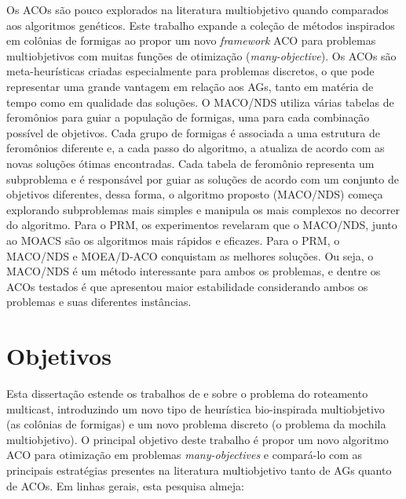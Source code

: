 Os \acp{ACO} são pouco explorados na literatura multiobjetivo quando comparados aos algoritmos genéticos. Este trabalho expande a coleção de métodos inspirados em colônias de formigas ao propor um novo \textit{framework} ACO para problemas multiobjetivos com muitas funções de otimização (\textit{many-objective}). Os ACOs são meta-heurísticas criadas especialmente para problemas discretos, o que pode representar uma grande vantagem em relação aos AGs, tanto em matéria de tempo como em qualidade das soluções. O MACO/NDS utiliza várias tabelas de feromônios para guiar a população de formigas, uma para cada combinação possível de objetivos. Cada grupo de formigas é associada a uma estrutura de feromônios diferente e, a cada passo do algoritmo, a atualiza de acordo com as novas soluções ótimas encontradas. Cada tabela de feromônio representa um subproblema e é responsável por guiar as soluções de acordo com um conjunto de objetivos diferentes, dessa forma, o algoritmo proposto (MACO/NDS) começa explorando subproblemas mais simples e manipula os mais complexos no decorrer do algoritmo. Para o PRM, os experimentos revelaram que o MACO/NDS, junto ao MOACS são os algoritmos mais rápidos e eficazes. Para o PRM, o MACO/NDS e MOEA/D-ACO conquistam as melhores soluções. Ou seja, o MACO/NDS é um método interessante para ambos os problemas, e dentre os ACOs testados é que apresentou maior estabilidade considerando ambos os problemas e suas diferentes instâncias.

\section{Objetivos}
Esta dissertação estende os trabalhos de  e  sobre o problema do roteamento multicast, introduzindo um novo tipo de heurística bio-inspirada multiobjetivo (as colônias de formigas) e um novo problema discreto (o problema da mochila multiobjetivo). O principal objetivo deste trabalho é propor um novo algoritmo ACO para otimização em problemas \textit{many-objectives} e compará-lo com as principais estratégias presentes na literatura multiobjetivo tanto de AGs quanto de ACOs. Em linhas gerais, esta pesquisa almeja:
 
